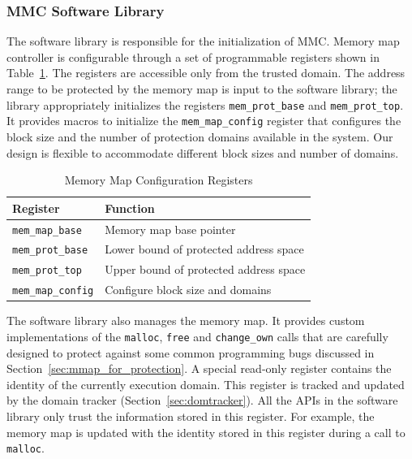 \subsubsection{MMC Software Library}
\label{sec:mmc_for_protection}
%
The software library is responsible for the initialization of MMC.
%
Memory map controller is configurable through a set of
programmable registers shown in Table~\ref{tab:mmap_config_regs}.
%
The registers are accessible only from the trusted domain.
%
The address range to be protected by the memory map is input to the
software library; the library appropriately initializes the registers
\texttt{mem\_prot\_base} and \texttt{mem\_prot\_top}.
%
It provides macros to initialize the \texttt{mem\_map\_config}
register that configures the block size and the number of protection
domains available in the system.
%
Our design is flexible to accommodate different block sizes and number
of domains.
%
\begin{table}[htdp]
\centering
\small{
\begin{tabular}{|l|l|}
	\hline
	Register & Function\\
	\hline
	\texttt{mem\_map\_base} & Memory map base pointer \\
	\texttt{mem\_prot\_base} & Lower bound of protected address space\\
	\texttt{mem\_prot\_top} & Upper bound of protected address space\\
	\texttt{mem\_map\_config} & Configure block size and domains\\
	\hline
\end{tabular}}
\caption{Memory Map Configuration Registers}
\label{tab:mmap_config_regs}
\end{table}

The software library also manages the memory map.
%
It provides custom implementations of the \texttt{malloc},
\texttt{free} and \texttt{change\_own} calls that are carefully
designed to protect against some common programming bugs discussed in
Section~\ref{sec:mmap_for_protection}.
%
A special read-only register contains the identity of the currently
execution domain.
%
This register is tracked and updated by the domain
tracker (Section~\ref{sec:domtracker}).
%
All the APIs in the software library only trust the information stored
in this register.
%
For example, the memory map is updated with the identity stored in
this register during a call to \texttt{malloc}.
%
